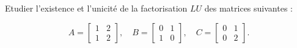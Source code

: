 Etudier l'existence et l'unicité de la factorisation $LU$ des matrices suivantes :

\begin{equation*}
  A = \begin{bmatrix}
        1 & 2   \\
        1 & 2
      \end{bmatrix}
  , \quad
  B = \begin{bmatrix}
        0 & 1   \\
        1 & 0
      \end{bmatrix}
  , \quad
  C = \begin{bmatrix}
        0 & 1   \\
        0 & 2
      \end{bmatrix}
  .
\end{equation*}
